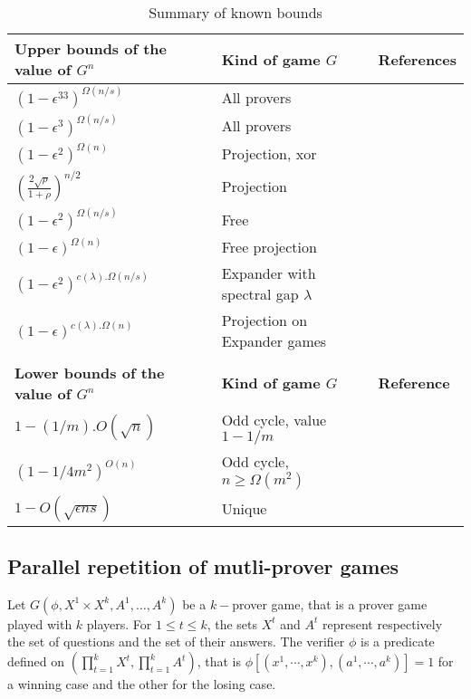 \begin{table}[h]
\begin{tabular}{lll}
\hline 
\textbf{Upper bounds of the value of $G^n$} &\textbf{ Kind of game $G$} & \textbf{References} \\ 
\hline 
$(1-\epsilon^33)^{\Omega(n/s) }$& All provers &  \cite{raz1998parallel} \\ 
$(1-\epsilon^3)^{\Omega(n/s) }$&  All provers &  \cite{holenstein2007parallel} \\ 
$(1-\epsilon^2)^{\Omega(n) }$&  Projection, xor & \cite{rao2011parallel,raz2010parallel}\\
$\left(\frac{2\sqrt{\rho}}{1+\rho} \right)^{n/2}$ & Projection & \cite{dinur2014analytical} \\
$(1-\epsilon^2)^{\Omega(n/s) }$& Free & \cite{barak2009strong}\\
$(1-\epsilon)^{\Omega(n) }$ & Free projection & \cite{barak2009strong}\\
$(1-\epsilon^2)^{c(\lambda). \Omega(n/s) }$& Expander with spectral gap $\lambda$ & \cite{raz2012strong}\\
$(1-\epsilon)^{c(\lambda). \Omega(n) }$& Projection on Expander games & \cite{raz2012strong}\\
\hline \\
\hline
\textbf{Lower bounds of the value of $G^n$} & \textbf{Kind of game $G$} & \textbf{Reference} \\ 
\hline 
$1-(1/m).{O(\sqrt{n})}$& Odd cycle, value $1-1/m$ & \cite{feige2007understanding}\\
$(1-1/4m^2)^{O(n)}$& Odd cycle, $n\geq \Omega(m^2)$ & \cite{raz2011counterexample}\\
$1-O(\sqrt{\epsilon ns})$ & Unique & \cite{steurer2010improved} \\
\hline 
\end{tabular} 
\caption{Summary of known bounds} \label{bkp}
\end{table}



\subsection{Parallel repetition of mutli-prover games}

Let $G(\phi, X^1 \times X^k, A^1, \ldots, A^k)$ be a $k-$prover game, that is a prover game played with $k$ players. For $1 \leq t \leq k$, the sets $X^t$ and $A^t$ represent respectively the set of questions and the set of their answers. The verifier $\phi$ is a predicate  defined on $\left( \prod\limits_{t=1}^k X^t, \prod\limits_{t=1}^k A^t \right)$, that is $\phi [(x^1, \cdots , x^k),(a^1, \cdots , a^k)]=1$ for a winning case and  the other for the losing case.

